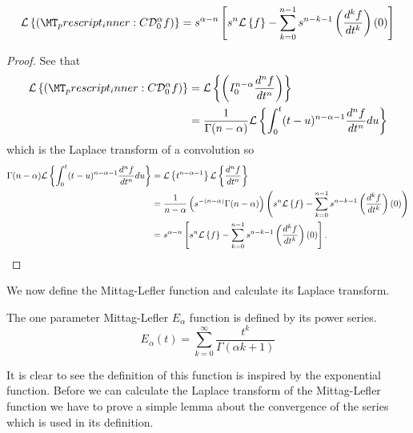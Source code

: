 \documentclass{article}
\begin{document}
\begin{lemma}
\label{lem:lap_cap}

	\begin{align*}
		\laplace{\capder{0}{\alpha}{f}} = s^{\alpha - n} \left[ s^n \laplace{f} - \sum_{k=0}^{n-1} s^{n-k-1} \left( \der{f}{t}{k} \right)(0) \right]
	\end{align*}
\end{lemma}
\begin{proof}
	See that
	\begin{align*}
		\laplace{\capder{0}{\alpha}{f}} &= \laplace{  \rli{0}{n-\alpha}{\der{f}{t}{n}}} \\
			&= \frac{1}{\Gamma(n-\alpha)}\laplace{ \int_0^t (t-u)^{n-\alpha-1} \der{f}{t}{n} du} \\ 
	\end{align*}
	which is the Laplace transform of a convolution so
	\begin{align*}
		\Gamma(n-\alpha)\mathcal{L} \left\{  \int_0^t (t-u)^{n-\alpha-1} \frac{d^{n}f}{dt^{n}} du \right\} &= \mathcal{L} \left\{ t^{n-\alpha-1} \right\} \mathcal{L} \left\{ \frac{d^{n}f}{dt^{n}} \right\} \\
		&= \frac{1}{n-\alpha} \left( s^{-(n-\alpha)} \Gamma(n-\alpha) \right) \left( s^n \mathcal{L} \left\{ f \right\} - \sum_{k=0}^{n-1} s^{n-k-1} \left( \frac{d^{k}f}{dt^{k}} \right)(0) \right) \\
		&= s^{\alpha - n} \left[ s^n \mathcal{L} \left\{ f \right\} - \sum_{k=0}^{n-1} s^{n-k-1} \left( \frac{d^{k}f}{dt^{k}} \right)(0) \right].
	\end{align*}	
\end{proof}

We now define the Mittag-Lefler function and calculate its Laplace transform.

\begin{definition}
	The one parameter Mittag-Lefler $ E_\alpha $ function is defined by its power series.
	$$
		E_\alpha(t) = \sum_{k=0}^{\infty} \frac{t^k}{\Gamma(\alpha k + 1)}
	$$
\end{definition}
It is clear to see the definition of this function is inspired by the exponential function. Before we can calculate the 
Laplace transform of the Mittag-Lefler function we have to prove a simple lemma about the convergence of the 
series which is used in its definition.
\end{document}
